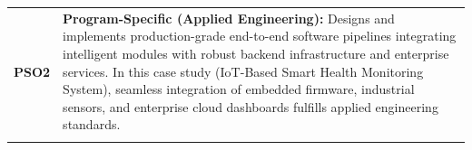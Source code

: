 {\begin{longtable}{@{}>{\centering\arraybackslash}p{1.8cm} p{13.2cm}@{}}
    \addlinespace
\textbf{PSO2} & \textbf{Program-Specific (Applied Engineering):} Designs and implements production-grade end-to-end software pipelines integrating intelligent modules with robust backend infrastructure and enterprise services. In this case study (IoT-Based Smart Health Monitoring System), seamless integration of embedded firmware, industrial sensors, and enterprise cloud dashboards fulfills applied engineering standards. \\
    \addlinespace
    \bottomrule
\end{longtable}}